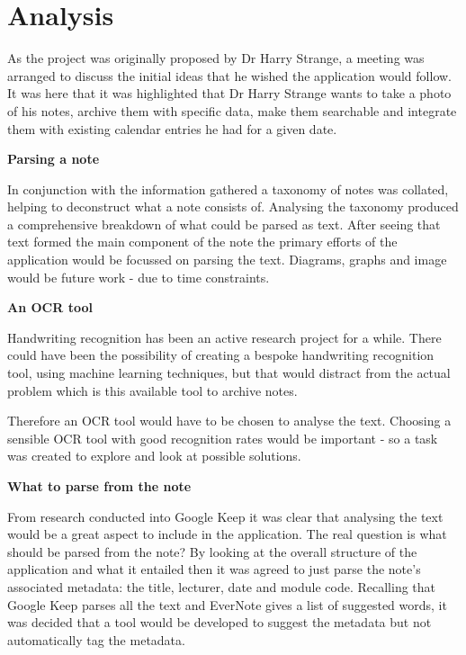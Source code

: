 \section{Analysis}

As the project was originally proposed by Dr Harry Strange, a meeting was arranged to discuss the initial ideas that he wished the application would follow. It was here that it was highlighted that Dr Harry Strange wants to take a photo of his notes, archive them with specific data, make them searchable and integrate them with existing calendar entries he had for a given date.

\noindent
\textbf{Parsing a note}


In conjunction with the information gathered a taxonomy of notes was collated, helping to deconstruct what a note consists of. Analysing the taxonomy produced a comprehensive breakdown of what could be parsed as text. After seeing that text formed the main component of the note the primary efforts of the application would be focussed on parsing the text. Diagrams, graphs and image would be future work - due to time constraints.

\noindent
\textbf{An OCR tool}


Handwriting recognition has been an active research project for a while. There could have been the possibility of creating a bespoke handwriting recognition tool, using machine learning techniques, but that would distract from the actual problem which is this available tool to archive notes.

Therefore an OCR tool would have to be chosen to analyse the text. Choosing a sensible OCR tool with good recognition rates would be important - so a task was created to explore and look at possible solutions.

\noindent
\textbf{What to parse from the note}


From research conducted into Google Keep it was clear that analysing the text would be a great aspect to include in the application. The real question is what should be parsed from the note? By looking at the overall structure of the application and what it entailed then it was agreed to just parse the note's associated metadata: the title, lecturer, date and module code. Recalling that Google Keep parses all the text and EverNote gives a list of suggested words, it was decided that a tool would be developed to suggest the metadata but not automatically tag the metadata.

